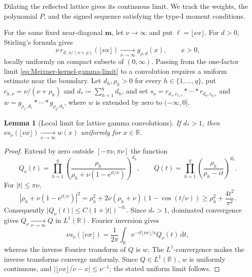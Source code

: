 \documentclass[10pt]{amsart}
\newcommand{\R}{\mathbb R}
\newcommand{\e}{\mathrm e}
\newcommand{\dd}{\,\mathrm d}
\newcommand{\mm}{\boldsymbol m}
\newcommand{\abs}[1]{\lvert#1\rvert}
\theoremstyle{plain}
\newtheorem{lemma}[theorem]{Lemma}
\theoremstyle{definition}
\theoremstyle{remark}
\begin{document}
Dilating the reflected lattice gives its continuous limit. We track the
weights, the polynomial \(P\), and the signed sequence satisfying the
type-I moment conditions.

For the same fixed near-diagonal \(\mm\), let \(\nu\to\infty\) and put
\(\ell=\lfloor\nu x\rfloor\). For \(d>0\), Stirling's formula gives
\begin{equation}
 \nu\,r_{d,\,\nu/(\nu+\rho)}(\lfloor\nu x\rfloor)
 \xrightarrow[\nu\to\infty]{}g_{\rho,d}(x),\qquad x>0,
 \label{eq:Meixner-kernel-gamma-limit}
\end{equation}
locally uniformly on compact subsets of \((0,\infty)\). Passing from the
one-factor limit \eqref{eq:Meixner-kernel-gamma-limit} to a convolution
requires a uniform estimate near the boundary. Let \(d_h,\rho_h>0\) for
every \(h\in\{1,\ldots,q\}\), put
\(c_{h,\nu}=\nu/(\nu+\rho_h)\) and
\(d_*\coloneq\sum_{h=1}^q d_h\), and set
\(s_\nu=r_{d_1,c_{1,\nu}}*\cdots*r_{d_q,c_{q,\nu}}\) and
\(w=g_{\rho_1,d_1}*\cdots*g_{\rho_q,d_q}\),
where \(w\) is extended by zero to \((-\infty,0]\).

\begin{lemma}[Local limit for lattice gamma convolutions]
\label{lem:lattice-gamma-convolution}
If \(d_*>1\), then
\(\nu s_\nu(\lfloor\nu x\rfloor)\xrightarrow[\nu\to\infty]{}w(x)\)
uniformly for \(x\in\R\).
\end{lemma}

\begin{proof}
Extend by zero outside \([-\pi\nu,\pi\nu]\) the function
\[
 Q_\nu(t)=
 \prod_{h=1}^q
 \left(\frac{\rho_h}
 {\rho_h+\nu(1-\e^{it/\nu})}\right)^{d_h},
 \qquad
 Q(t)=\prod_{h=1}^q
 \left(\frac{\rho_h}{\rho_h-it}\right)^{d_h}.
\]
For \(\abs t\le\pi\nu\),
\[
 \left|\rho_h+\nu(1-\e^{it/\nu})\right|^2
 =\rho_h^2+2\nu(\rho_h+\nu)(1-\cos(t/\nu))
 \ge \rho_h^2+\frac{4t^2}{\pi^2}.
\]
Consequently \(\abs{Q_\nu(t)}\le
C(1+\abs t)^{-d_*}\). Since \(d_*>1\), dominated convergence gives
\(Q_\nu\xrightarrow[\nu\to\infty]{}Q\) in \(L^1(\R)\). Fourier inversion gives
\[
 \nu s_\nu(\lfloor\nu x\rfloor)
 =\frac1{2\pi}\int_{\R}
 \e^{-it\lfloor\nu x\rfloor/\nu}Q_\nu(t)\dd t,
\]
whereas the inverse Fourier transform of \(Q\) is \(w\). The
\(L^1\)-convergence makes the inverse transforms converge uniformly. Since
\(Q\in L^1(\R)\), \(w\) is uniformly continuous, and
\(\abs{\lfloor\nu x\rfloor/\nu-x}\le\nu^{-1}\); the stated uniform limit
follows.
\end{proof}
\end{document}
